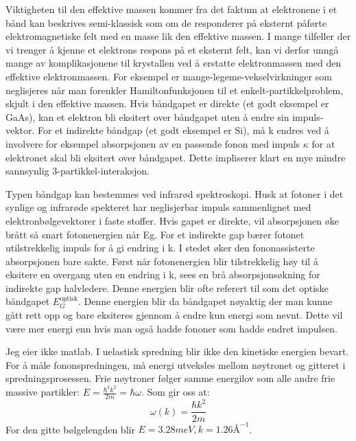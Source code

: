 \documentclass{article}
\begin{document}
Viktigheten til den effektive massen kommer fra det faktum at elektronene i et bånd kan beskrives semi-klassisk som om de responderer på eksternt påførte elektromagnetiske felt med en masse lik den effektive massen. I mange tilfeller der vi trenger å kjenne et elektrons respons på et eksternt felt, kan vi derfor unngå mange av komplikasjonene til krystallen ved å erstatte elektronmassen med den effektive elektronmassen. For eksempel er mange-legeme-vekselvirkninger som neglisjeres når man forenkler Hamiltonfunksjonen til et enkelt-partikkelproblem, skjult i den effektive massen.
Hvis båndgapet er direkte (et godt eksempel er GaAs), kan et elektron bli eksitert over båndgapet uten å endre sin impuls-vektor. For et indirekte båndgap (et godt eksempel er Si), må k endres ved å involvere for eksempel absorpsjonen av en passende fonon med impuls $\kappa$ for at elektronet skal bli eksitert over båndgapet. Dette impliserer klart en mye mindre sannsynlig 3-partikkel-interaksjon.

Typen båndgap kan bestemmes ved infrarød spektroskopi. Husk at fotoner i det synlige og infrarøde spekteret har neglisjerbar impuls sammenlignet med elektronbølgevektorer i faste stoffer. Hvis gapet er direkte, vil absorpsjonen øke brått så snart fotonenergien når Eg. For et indirekte gap bærer fotonet utilstrekkelig impuls for å gi endring i k. I stedet øker den fononassisterte absorpsjonen bare sakte. Først når fotonenergien blir tilstrekkelig høy til å eksitere en overgang uten en endring i k, sees en brå absorpsjonsøkning for indirekte gap halvledere. Denne energien blir ofte referert til som det optiske båndgapet \( E_G^{\text{optisk}} \). Denne energien blir da båndgapet nøyaktig der man kunne gått rett opp og bare eksiteres gjennom å endre kun energi som nevnt. Dette vil være mer energi enn hvis man også hadde fononer som hadde endret impulsen.

Jeg eier ikke matlab.
I uelastisk spredning blir ikke den kinetiske energien bevart. For å måle fononspredningen, må energi utveksles mellom nøytronet og gitteret i spredningsprosessen.
Frie nøytroner følger samme energilov som alle andre frie massive partikler: $E = \frac{\hbar^2 k^2}{2m} = \hbar \omega$. Som gir oss at:
\begin{equation}
    \omega(k) = \frac{\hbar k^2}{2m}
\end{equation}
For den gitte bølgelengden blir $E = 3.28 meV, k = 1.26 Å^{-1}$.
\end{document}
